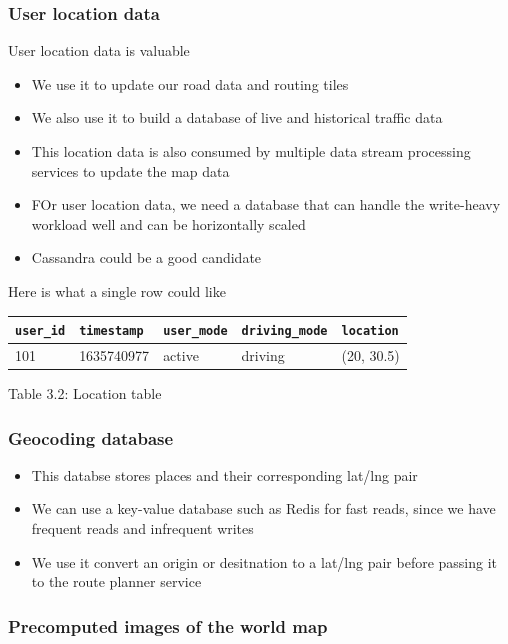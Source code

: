 \documentclass{report}
\theoremstyle{definition}
\let\oldsubsubsection\subsubsection
\renewcommand{\subsubsection}{\oldsubsubsection*}
\begin{document}
\subsubsection{User location data}

User location data is valuable

\begin{itemize}
\item
We use it to update our road data and routing tiles
\item
We also use it to build a database of live and historical traffic data
\item
This location data is also consumed by multiple data stream processing services to update the map data
\item
FOr user location data, we need a database that can handle the write-heavy workload well and can be horizontally scaled
\item
Cassandra could be a good candidate
\end{itemize}

Here is what a single row could like

\begin{tabular}{|p{3cm}|p{3cm}|p{3cm}|p{3cm}|p{3cm}|}
\hline
\lstinline|user_id| & \lstinline|timestamp| & \lstinline|user_mode| & \lstinline|driving_mode| & \lstinline|location| \\
\hline
101 & 1635740977 & active & driving & (20, 30.5) \\
\hline
\end{tabular}

Table 3.2: Location table

\subsubsection{Geocoding database}

\begin{itemize}
\item
This databse stores places and their corresponding lat/lng pair
\item
We can use a key-value database such as Redis for fast reads, since we have frequent reads and infrequent writes
\item
We use it convert an origin or desitnation to a lat/lng pair before passing it to the route planner service
\end{itemize}

\subsubsection{Precomputed images of the world map}
\end{document}
